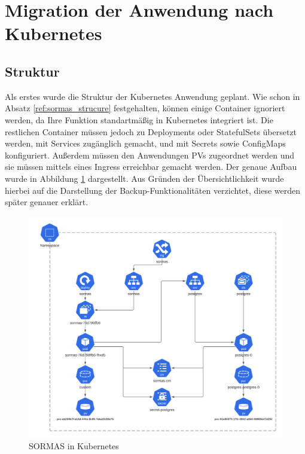 \section{Migration der Anwendung nach Kubernetes}
\subsection{Struktur}
Als erstes wurde die Struktur der Kubernetes Anwendung geplant. 
Wie schon in Absatz \ref{ref:sormas_strucure} festgehalten, können einige Container ignoriert werden, da Ihre Funktion standartmäßig in Kubernetes integriert ist. 
Die restlichen Container müssen jedoch zu Deployments oder StatefulSets übersetzt werden, mit Services zugänglich gemacht, und mit Secrets sowie ConfigMaps konfiguriert. 
Außerdem müssen den Anwendungen \ac{PV}s zugeordnet werden und sie müssen mittels eines Ingress erreichbar gemacht werden.
Der genaue Aufbau wurde in Abbildung \ref{fig:sormas_kubernetes} dargestellt. 
Aus Gründen der Übersichtlichkeit wurde hierbei auf die Darstellung der Backup-Funktionalitäten verzichtet, diese werden später genauer erklärt.

\begin{figure}[h!]
\centering    
\includegraphics[width=\textwidth]{bilder/sormas_kubernetes.png}
\caption{SORMAS in Kubernetes}
\label{fig:sormas_kubernetes}
\end{figure}


